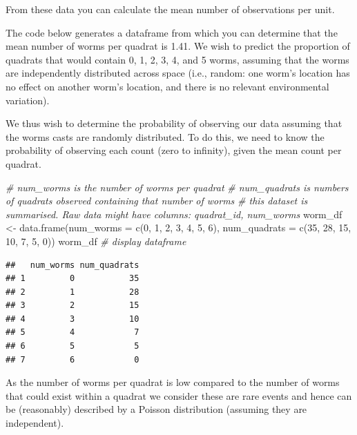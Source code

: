 \documentclass[
  11pt,
  a4paper,
]{book}
\newenvironment{Shaded}{\begin{snugshade}}{\end{snugshade}}
\newcommand{\AttributeTok}[1]{\textcolor[rgb]{0.77,0.63,0.00}{#1}}
\newcommand{\CommentTok}[1]{\textcolor[rgb]{0.56,0.35,0.01}{\textit{#1}}}
\newcommand{\DecValTok}[1]{\textcolor[rgb]{0.00,0.00,0.81}{#1}}
\newcommand{\FunctionTok}[1]{\textcolor[rgb]{0.00,0.00,0.00}{#1}}
\newcommand{\NormalTok}[1]{#1}
\newcommand{\OtherTok}[1]{\textcolor[rgb]{0.56,0.35,0.01}{#1}}
\begin{document}
From these data you can calculate the mean number of observations per unit.

The code below generates a dataframe from which you can determine that the mean number of worms per quadrat is 1.41. We wish to predict the proportion of quadrats that would contain 0, 1, 2, 3, 4, and 5 worms, assuming that the worms are independently distributed across space (i.e., random: one worm's location has no effect on another worm's location, and there is no relevant environmental variation).

We thus wish to determine the probability of observing our data assuming that the worms casts are randomly distributed. To do this, we need to know the probability of observing each count (zero to infinity), given the mean count per quadrat.

\begin{Shaded}
\begin{Highlighting}[]
\CommentTok{\# num\_worms is the number of worms per quadrat}
\CommentTok{\# num\_quadrats is numbers of quadrats observed containing that number of worms}
\CommentTok{\# this dataset is summarised. Raw data might have columns: quadrat\_id, num\_worms}
\NormalTok{worm\_df }\OtherTok{\textless{}{-}} \FunctionTok{data.frame}\NormalTok{(}\AttributeTok{num\_worms =} \FunctionTok{c}\NormalTok{(}\DecValTok{0}\NormalTok{, }\DecValTok{1}\NormalTok{, }\DecValTok{2}\NormalTok{, }\DecValTok{3}\NormalTok{, }\DecValTok{4}\NormalTok{, }\DecValTok{5}\NormalTok{, }\DecValTok{6}\NormalTok{),}
                      \AttributeTok{num\_quadrats =} \FunctionTok{c}\NormalTok{(}\DecValTok{35}\NormalTok{, }\DecValTok{28}\NormalTok{, }\DecValTok{15}\NormalTok{, }\DecValTok{10}\NormalTok{, }\DecValTok{7}\NormalTok{, }\DecValTok{5}\NormalTok{, }\DecValTok{0}\NormalTok{))}
\NormalTok{worm\_df }\CommentTok{\# display dataframe}
\end{Highlighting}
\end{Shaded}

\begin{verbatim}
##   num_worms num_quadrats
## 1         0           35
## 2         1           28
## 3         2           15
## 4         3           10
## 5         4            7
## 6         5            5
## 7         6            0
\end{verbatim}

As the number of worms per quadrat is low compared to the number of worms that could exist within a quadrat we consider these are rare events and hence can be (reasonably) described by a Poisson distribution (assuming they are independent).
\end{document}
